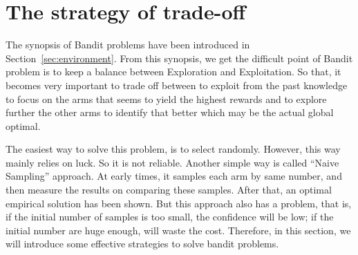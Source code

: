 %
%
\let\textcircled=\pgftextcircled
\section{The strategy of trade-off}
\label{sec:tradeoff}

The synopsis of Bandit problems have been introduced in Section~\ref{sec:environment}. From this synopsis, we get the difficult point of Bandit problem is to keep a balance between Exploration and Exploitation. So that, it becomes very important to trade off between to exploit from the past knowledge to focus on the arms that seems to yield the highest rewards and to explore further the other arms to identify that better which may be the actual global optimal. 

The easiest way to solve this problem, is to select randomly. However, this way mainly relies on luck. So it is not reliable. Another simple way is called ``Naive Sampling'' approach. At early times, it samples each arm by same number, and then measure the results on comparing these samples. After that, an optimal empirical solution has been shown. But this approach also has a problem, that is, if the initial number of samples is too small, the confidence will be low; if the initial number are huge enough, will waste the cost. Therefore, in this section, we will introduce some effective strategies to solve bandit problems.
\
\
\
\
\
\










